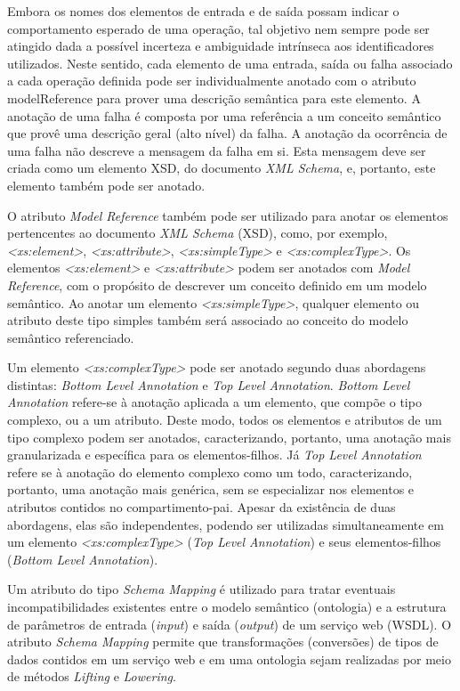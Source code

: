Embora os nomes dos elementos de entrada e de saída possam indicar o comportamento esperado de uma operação, tal objetivo nem sempre pode ser atingido dada a possível incerteza e ambiguidade intrínseca aos identificadores utilizados. Neste sentido, cada elemento de uma entrada, saída ou falha associado a cada operação definida pode ser individualmente anotado com o atributo modelReference para prover uma descrição semântica para este elemento. A anotação de uma falha é composta por uma referência a um conceito semântico que provê uma descrição geral (alto nível) da falha. A anotação da ocorrência de uma falha não descreve a mensagem da falha em si. Esta mensagem deve ser criada como um elemento XSD, do documento \textit{XML Schema}, e, portanto, este elemento também pode ser anotado. 

O atributo \textit{Model Reference} também pode ser utilizado para anotar os elementos pertencentes ao documento \textit{XML Schema} (XSD), como, por exemplo, \textit{<xs:element>}, \textit{<xs:attribute>}, \textit{<xs:simpleType>} e \textit{<xs:complexType>}. Os elementos \textit{<xs:element>} e \textit{<xs:attribute>} podem ser anotados com \textit{Model Reference}, com o propósito de descrever um conceito definido em um modelo semântico. Ao anotar um elemento \textit{<xs:simpleType>}, qualquer elemento ou atributo deste tipo simples também será associado ao conceito do modelo semântico referenciado.

Um elemento \textit{<xs:complexType>} pode ser anotado segundo duas abordagens distintas: \textit{Bottom Level Annotation} e \textit{Top Level Annotation}. \textit{Bottom Level Annotation} refere-se à anotação aplicada a um elemento, que compõe o tipo complexo, ou a um atributo. Deste modo, todos os elementos e atributos de um tipo complexo podem ser anotados, caracterizando, portanto, uma anotação mais granularizada e específica para os elementos-filhos. Já \textit{Top Level Annotation} refere se à anotação do elemento complexo como um todo, caracterizando, portanto, uma anotação mais genérica, sem se especializar nos elementos e atributos contidos no compartimento-pai. Apesar da existência de duas abordagens, elas são independentes, podendo ser utilizadas simultaneamente em um elemento \textit{<xs:complexType>} (\textit{Top Level Annotation}) e seus elementos-filhos (\textit{Bottom Level Annotation}).

Um atributo do tipo \textit{Schema Mapping} é utilizado para tratar eventuais incompatibilidades existentes entre o modelo semântico (ontologia) e a estrutura de parâmetros de entrada (\textit{input}) e saída (\textit{output}) de um serviço web (WSDL). O atributo \textit{Schema Mapping} permite que transformações (conversões) de tipos de dados contidos em um serviço web e em uma ontologia sejam realizadas por meio de métodos \textit{Lifting} e \textit{Lowering}.

